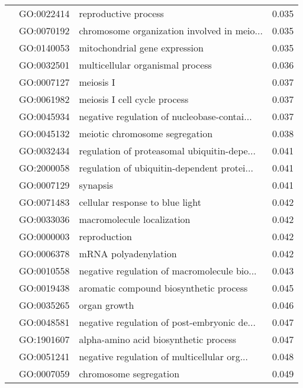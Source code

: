 \begin{longtable}{lllr}
   & GO:0022414 &                         reproductive process &         0.035 \\
   & GO:0070192 &  chromosome organization involved in meio... &         0.035 \\
   & GO:0140053 &                mitochondrial gene expression &         0.035 \\
   & GO:0032501 &             multicellular organismal process &         0.036 \\
   & GO:0007127 &                                    meiosis I &         0.037 \\
   & GO:0061982 &                 meiosis I cell cycle process &         0.037 \\
   & GO:0045934 &  negative regulation of nucleobase-contai... &         0.037 \\
   & GO:0045132 &               meiotic chromosome segregation &         0.038 \\
   & GO:0032434 &  regulation of proteasomal ubiquitin-depe... &         0.041 \\
   & GO:2000058 &  regulation of ubiquitin-dependent protei... &         0.041 \\
   & GO:0007129 &                                     synapsis &         0.041 \\
   & GO:0071483 &              cellular response to blue light &         0.042 \\
   & GO:0033036 &                   macromolecule localization &         0.042 \\
   & GO:0000003 &                                 reproduction &         0.042 \\
   & GO:0006378 &                         mRNA polyadenylation &         0.042 \\
   & GO:0010558 &  negative regulation of macromolecule bio... &         0.043 \\
   & GO:0019438 &       aromatic compound biosynthetic process &         0.045 \\
   & GO:0035265 &                                 organ growth &         0.046 \\
   & GO:0048581 &  negative regulation of post-embryonic de... &         0.047 \\
   & GO:1901607 &        alpha-amino acid biosynthetic process &         0.047 \\
   & GO:0051241 &  negative regulation of multicellular org... &         0.048 \\
   & GO:0007059 &                       chromosome segregation &         0.049 \\

\end{longtable}
